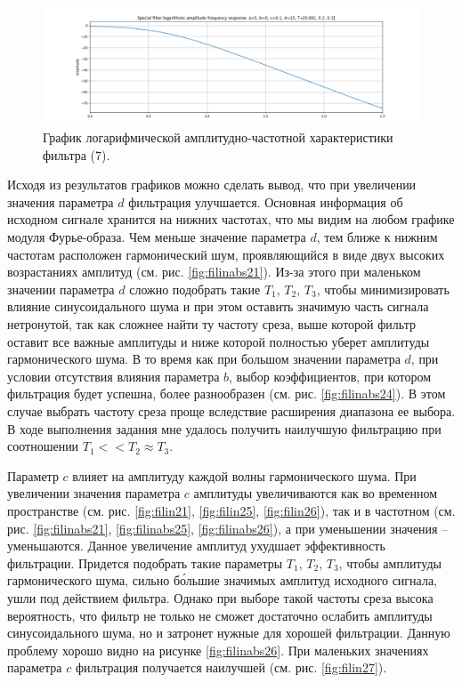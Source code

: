 \documentclass[a4paper, 12pt]{article}
\begin{document}
    \begin{figure}[H]
        \centering
        \includegraphics[scale=0.4]{7_fl2_lafr.png}
        \captionsetup{skip=0pt}
        \caption{График логарифмической амплитудно-частотной характеристики фильтра (7).}
        \label{fig:filinlafr27}
    \end{figure}


    Исходя из результатов графиков можно сделать вывод, что при увеличении значения параметра $d$ фильтрация
    улучшается. Основная информация об исходном сигнале хранится на нижних частотах, что мы видим на любом
    графике модуля Фурье-образа. Чем меньше значение параметра $d$, тем ближе к нижним частотам расположен
    гармонический шум, проявляющийся в виде двух высоких возрастаниях амплитуд (см. рис. \ref{fig:filinabs21}). Из-за этого при маленьком
    значении параметра $d$ сложно подобрать такие $T_1,\,T_2,\,T_3$, чтобы минимизировать влияние синусоидального
    шума и при этом оставить значимую часть сигнала нетронутой, так как сложнее найти ту частоту среза, выше которой
    фильтр оставит все важные амплитуды и ниже которой полностью уберет амплитуды гармонического шума. В то время как
    при большом значении параметра $d$, при условии отсутствия влияния параметра $b$, выбор коэффициентов, при котором фильтрация
    будет успешна, более разнообразен (см. рис. \ref{fig:filinabs24}). В этом случае выбрать частоту среза проще вследствие
    расширения диапазона ее выбора. В ходе выполнения задания мне удалось получить наилучшую фильтрацию при соотношении
    $T_1<<T_2\approx T_3$.


    Параметр $c$ влияет на амплитуду каждой волны гармонического шума. При увеличении значения параметра $c$ амплитуды увеличиваются
    как во временном пространстве (см. рис. \ref{fig:filin21}, \ref{fig:filin25}, \ref{fig:filin26}), так и в частотном
    (см. рис. \ref{fig:filinabs21}, \ref{fig:filinabs25}, \ref{fig:filinabs26}), а при уменьшении значения -- уменьшаются.
    Данное увеличение амплитуд ухудшает эффективность фильтрации. Придется подобрать такие параметры $T_1,\,T_2,\,T_3$,
    чтобы амплитуды гармонического шума, сильно б\'{о}льшие значимых амплитуд исходного сигнала, ушли под действием фильтра.
    Однако при выборе такой частоты среза высока вероятность, что фильтр не только не сможет достаточно ослабить амплитуды
    синусоидального шума, но и затронет нужные для хорошей фильтрации. Данную проблему хорошо видно на рисунке \ref{fig:filinabs26}.
    При маленьких значениях параметра $c$ фильтрация получается наилучшей (см. рис. \ref{fig:filin27}).
\end{document}

